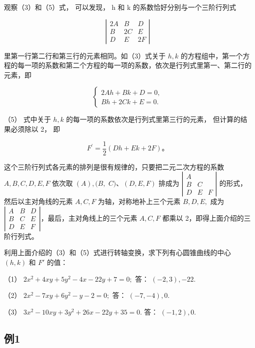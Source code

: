 观察（3）和（5）式， 可以发现， h 和 k 的系数恰好分别与一个三阶行列式

\[
\left| \begin{array}{ccc} 2 A & B & D \\ B & 2 C & E \\ D & E & 2 F \end{array} \right|
\]

里第一行第二行和第三行的元素相同。如（3）式关于 \(h, k\)
的方程组中，第一个方程的每一项的系数和第二个方程的每一项的系数，依次是行列式里第一、第二行的元素，即

\[
\left\{ \begin{array}{l} 2 A h + B k + D = 0, \\ B h + 2 C k + E = 0. \end{array} \right.
\]

（5） 式中关于 \(h, k\) 的每一项的系数依次是行列式里第三行的元素，
但计算的结果必须除以 2， 即

\[
F^{\prime} = \frac {1}{2} (D h + E k + 2 F)\text{。}
\]

这个三阶行列式各元素的排列是很有规律的，只要把二元二次方程的系数
\(A, B, C, D, E, F\) 依次取 \((A), (B,\) \(C) \text{、} (D, E, F)\)
排成为
\(\left| \begin{array}{cc} A & \\ B & C \\ D & E & F \end{array} \right|\)
的形式，然后以主对角线的元素 \(A, C, F\) 为轴，对称地补上三个元素
\(B, D, E,\) 成为
\(\left| \begin{array}{cc} A & B & D \\ B & C & E \\ D & E & F \end{array} \right|\)，最后，主对角线上的三个元素
\(A, C, F\) 都乘以 2，即得上面介绍的三阶行列式。

利用上面介绍的（3）和（5）式进行转轴变换，求下列有心圆锥曲线的中心
\((h, k)\) 和 \(F'\) 的值：

（1） \(2x^{2} + 4xy + 5y^{2} - 4x - 22y + 7 = 0;\) 答：
\((-2,3), - 22.\)

（2） \(2x^{2}-7xy+6y^{2}-y-2=0;\) 答： \((-7,-4),0.\)

（3） \(3x^{2} - 10xy + 3y^{2} + 26x - 22y + 35 = 0.\) 答：
\((-1,2),0.\)

\subsection{例1}\label{ux4f8b1-37}

